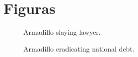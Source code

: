 \chapter{Figuras}

\vspace*{-3in}

\begin{figure}
\vspace{2.4in}
\caption{Armadillo slaying lawyer.}
\label{arm:fig1}
\end{figure}
\clearpage
\newpage

\begin{figure}
\vspace{2.4in}
\caption{Armadillo eradicating national debt.}
\label{arm:fig2}
\end{figure}
\clearpage
\newpage
